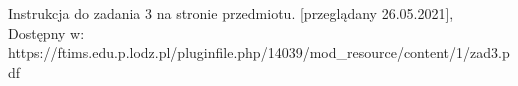 \documentclass[12pt]{article}
\begin{document}
\begin{thebibliography}{}
 Instrukcja do zadania 3 na stronie przedmiotu. [przeglądany 26.05.2021], Dostępny w: https://ftims.edu.p.lodz.pl/pluginfile.php/14039/mod\_resource/content/1/zad3.pdf


\end{thebibliography}
\end{document}
